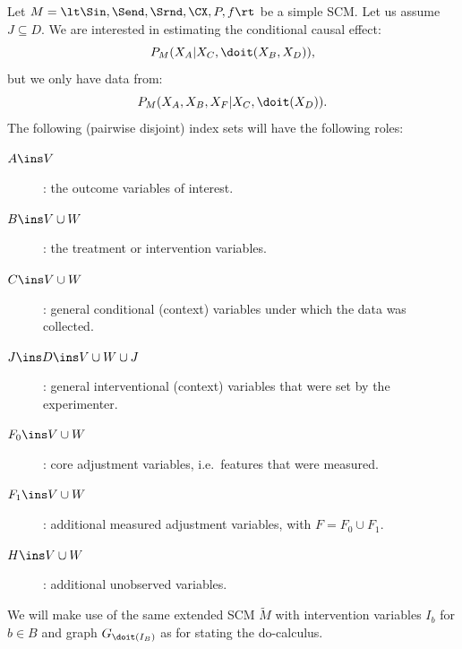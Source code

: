 Let $M = \lt \Sin, \Send, \Srnd, \CX, P, f \rt$ be a simple SCM.
Let us assume $J \subseteq D$.
We are interested in estimating the conditional causal effect:
\[ P_{M}(X_A|X_C,\doit(X_B,X_D)), \]
but we only have data from:
\[ P_{M}(X_A,X_B,X_F|X_C,\doit(X_D)). \]
The following (pairwise disjoint) index sets will have the following roles:
\begin{description}
  \item[$A \ins V$]: the outcome variables of interest.
  \item[$B \ins V \cup W$]: the treatment or intervention variables.
  \item[$C \ins V \cup W$]: general conditional (context) variables under which the data was collected.
  \item[$J \ins D \ins V \cup W \cup J$]: general interventional (context) variables that were set by the experimenter.
  \item[$F_0 \ins V \cup W$]: core adjustment variables, i.e.\ features that were measured.
  \item[$F_1 \ins V \cup W$]: additional measured adjustment variables, with $F = F_0 \cup F_1$.
  \item[$H \ins V \cup W$]: additional unobserved variables.
\end{description}
We will make use of the same extended SCM $\tilde{M}$ with intervention variables $I_b$ for $b \in B$ and graph
$G_{\doit(I_B)}$ as for stating the do-calculus.


